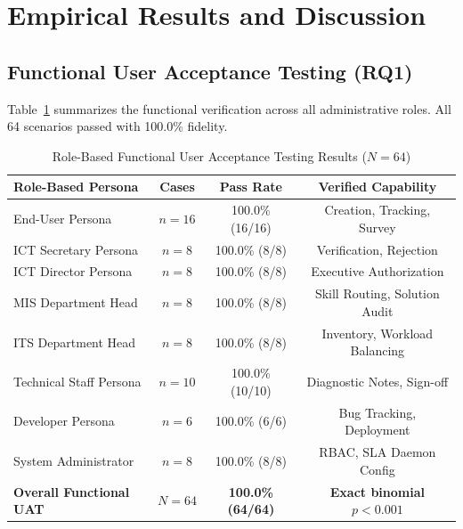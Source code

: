 \documentclass[conference]{IEEEtran}
\begin{document}
\section{Empirical Results and Discussion}

\subsection{Functional User Acceptance Testing (RQ1)}
Table~\ref{tab4} summarizes the functional verification across all administrative roles. All 64 scenarios passed with 100.0\% fidelity.

\begin{table}[htbp]
\caption{Role-Based Functional User Acceptance Testing Results ($N = 64$)}
\label{tab4}
\centering
\small
\begin{tabular}{lccc}
\toprule
\textbf{Role-Based Persona} & \textbf{Cases} & \textbf{Pass Rate} & \textbf{Verified Capability} \\
\midrule
End-User Persona & $n = 16$ & 100.0\% (16/16) & Creation, Tracking, Survey \\
ICT Secretary Persona & $n = 8$ & 100.0\% (8/8) & Verification, Rejection \\
ICT Director Persona & $n = 8$ & 100.0\% (8/8) & Executive Authorization \\
MIS Department Head & $n = 8$ & 100.0\% (8/8) & Skill Routing, Solution Audit \\
ITS Department Head & $n = 8$ & 100.0\% (8/8) & Inventory, Workload Balancing \\
Technical Staff Persona & $n = 10$ & 100.0\% (10/10) & Diagnostic Notes, Sign-off \\
Developer Persona & $n = 6$ & 100.0\% (6/6) & Bug Tracking, Deployment \\
System Administrator & $n = 8$ & 100.0\% (8/8) & RBAC, SLA Daemon Config \\
\midrule
\textbf{Overall Functional UAT} & \textbf{$N = 64$} & \textbf{100.0\% (64/64)} & \textbf{Exact binomial $p < 0.001$} \\
\bottomrule
\end{tabular}
\end{table}
\end{document}

